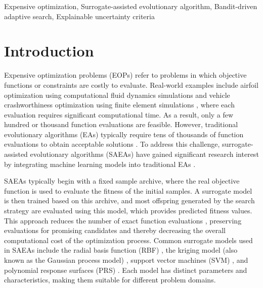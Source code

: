 \documentclass[review]{elsarticle}
\begin{document}
\begin{frontmatter}
\begin{keyword}
Expensive optimization, Surrogate-assisted evolutionary algorithm, Bandit-driven adaptive search, Explainable uncertainty criteria
\end{keyword}

\end{frontmatter}

\section{Introduction}
Expensive optimization problems (EOPs) refer to problems in which objective functions or constraints are costly to evaluate. Real-world examples include airfoil optimization using computational fluid dynamics simulations \cite{liu2023airfoils} and vehicle crashworthiness optimization using finite element simulations \cite{kumar2024optimization}, where each evaluation requires significant computational time. As a result, only a few hundred or thousand function evaluations are feasible. However, traditional evolutionary algorithms (EAs) typically require tens of thousands of function evaluations to obtain acceptable solutions \cite{he2023review}. To address this challenge, surrogate-assisted evolutionary algorithms (SAEAs) have gained significant research interest by integrating machine learning models into traditional EAs \cite{kudela2022recent}.

SAEAs typically begin with a fixed sample archive, where the real objective function is used to evaluate the fitness of the initial samples. A surrogate model is then trained based on this archive, and most offspring generated by the search strategy are evaluated using this model, which provides predicted fitness values. This approach reduces the number of exact function evaluations \cite{jin2018data}, preserving evaluations for promising candidates and thereby decreasing the overall computational cost of the optimization process. Common surrogate models used in SAEAs include the radial basis function (RBF) \cite{regis2013evolutionary, sun2017surrogate}, the kriging model (also known as the Gaussian process model) \cite{buche2005accelerating, liu2013gaussian}, support vector machines (SVM) \cite{loshchilov2010comparison, guo2018heterogeneous}, and polynomial response surfaces (PRS) \cite{zhou2005study, chavez2016polynomial}. Each model has distinct parameters and characteristics, making them suitable for different problem domains.
\end{document}
